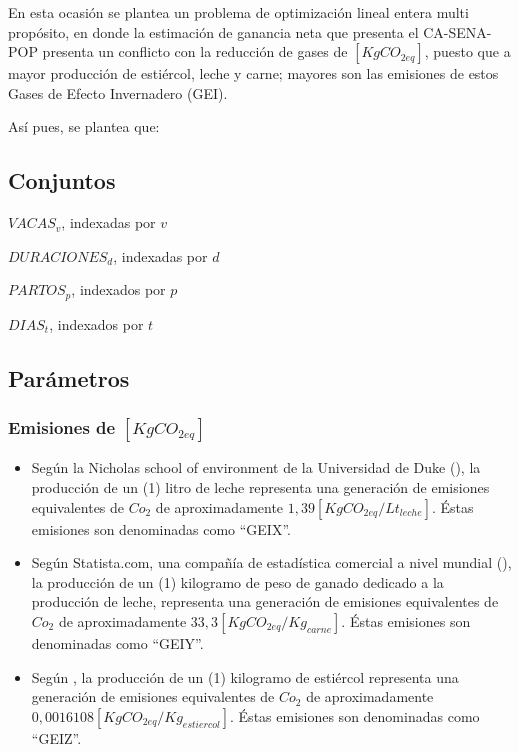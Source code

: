 En esta ocasión se plantea un problema de optimización lineal entera multi propósito, en donde la estimación de ganancia neta que presenta el CA-SENA-POP presenta un conflicto con la reducción de gases de $[KgCO_{2eq}]$, puesto que a mayor producción de estiércol, leche y carne; mayores son las emisiones de estos Gases de Efecto Invernadero (GEI).

Así pues, se plantea que:

\subsection{Conjuntos}
\begin{itemize}
\begin{multicols}{2}
    \item $VACAS_{v}$, indexadas por $v$
    \item $DURACIONES_{d}$, indexadas por $d$
    \item $PARTOS_{p}$, indexados por $p$
    \item $DIAS_{t}$, indexados por $t$
\end{multicols}
\end{itemize}
\subsection{Parámetros}

\subsubsection{Emisiones de $[KgCO_{2eq}]$}

\begin{itemize}
    \item Según la Nicholas school of environment de la Universidad de Duke (\cite{ecoduke}), la producción de un (1) litro de leche representa una generación de  emisiones equivalentes de $Co_{2}$ de aproximadamente $1,39[KgCO_{2eq}/Lt_{leche}]$. Éstas emisiones son denominadas como ``GEIX''.
    \item Según Statista.com, una compañía de estadística comercial a nivel mundial (\cite{statista}), la producción de un (1) kilogramo de peso de ganado dedicado a la producción de leche, representa una generación de  emisiones equivalentes de $Co_{2}$ de aproximadamente $33,3[KgCO_{2eq}/Kg_{carne}]$. Éstas emisiones son denominadas como ``GEIY''.
    \item Según \cite{manure}, la producción de un (1) kilogramo de estiércol representa una generación de  emisiones equivalentes de $Co_{2}$ de aproximadamente $0,0016108[KgCO_{2eq}/Kg_{estiercol}]$. Éstas emisiones son denominadas como ``GEIZ''.
\end{itemize}
